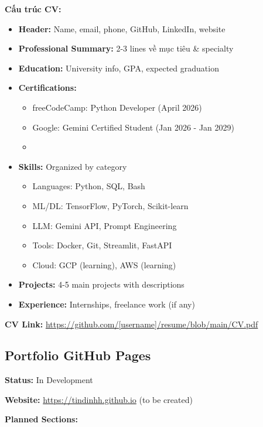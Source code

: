 \documentclass[12pt,a4paper]{article}
\begin{document}
\textbf{Cấu trúc CV:}
\begin{itemize}
    \item \textbf{Header:} Name, email, phone, GitHub, LinkedIn, website
    \item \textbf{Professional Summary:} 2-3 lines về mục tiêu \& specialty
    \item \textbf{Education:} University info, GPA, expected graduation
    \item \textbf{Certifications:}
    \begin{itemize}
        \item freeCodeCamp: Python Developer (April 2026)
        \item Google: Gemini Certified Student (Jan 2026 - Jan 2029)
        \item [Others as completed]
    \end{itemize}
    \item \textbf{Skills:} Organized by category
    \begin{itemize}
        \item Languages: Python, SQL, Bash
        \item ML/DL: TensorFlow, PyTorch, Scikit-learn
        \item LLM: Gemini API, Prompt Engineering
        \item Tools: Docker, Git, Streamlit, FastAPI
        \item Cloud: GCP (learning), AWS (learning)
    \end{itemize}
    \item \textbf{Projects:} 4-5 main projects with descriptions
    \item \textbf{Experience:} Internships, freelance work (if any)
\end{itemize}

\textbf{CV Link:} \url{https://github.com/[username]/resume/blob/main/CV.pdf}

\subsection{Portfolio GitHub Pages}

\textbf{Status:} In Development

\textbf{Website:} \url{https://tindinhh.github.io} (to be created)

\textbf{Planned Sections:}
\end{document}
